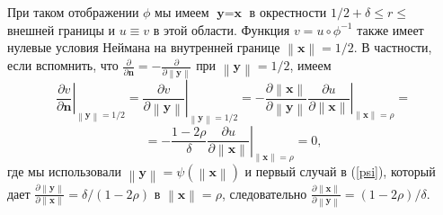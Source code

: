 \documentclass[a4paper, 12pt]{article}
\newcommand{\norm}[1]{\left\lVert#1\right\rVert}
\begin{document}
При таком отображении $\phi$ мы имеем $\textbf{y} = \textbf{x}$ в окрестности
$1/2 + \delta \le r \le$ внешней границы и $u \equiv v$ в этой области. Функция 
$v = u\circ \phi^{-1}$ также имеет нулевые условия Неймана на внутренней границе 
$\norm{\textbf{x}} = 1/2$. В частности, если вспомнить, что $\frac{\partial
}{\partial \textbf{n}} = - \frac{\partial}{\partial \norm{\textbf{y}}}$
при $\norm{\textbf{y}} = 1/2$, имеем
\begin{equation*}
\left.\frac{\partial v}{\partial \textbf{n}}\right|_{\norm{\textbf{y}}=1/2} = 
\left.\frac{\partial v}{\partial \norm{\textbf{y}}}\right|_{\norm{\textbf{y}}=1/2} =
-\frac{\partial \norm{\textbf{x}}}{\partial \norm{\textbf{y}}} 
\left.\frac{\partial u}{\partial \norm{\textbf{x}}}\right|_{\norm{\textbf{x}}=\rho} =
\end{equation*}  
\begin{equation*}
= -\frac{1-2\rho}{\delta} \left.\frac{\partial u}{\partial \norm{\textbf{x}}}
\right|_{\norm{\textbf{x}}=\rho} = 0,
\end{equation*}
где мы использовали $\norm{\textbf{y}} =\psi(\norm{\textbf{x}})$ и первый случай в
(\ref{psi}), который дает $\frac{\partial \norm{\textbf{y}}}
{\partial \norm{\textbf{x}}}=\delta/(1-2\rho)$ в $\norm{\textbf{x}} = \rho$,
следовательно $\frac{\partial \norm{\textbf{x}}}{\partial\norm{\textbf{y}}}
=(1-2\rho)/\delta$.
\end{document}
